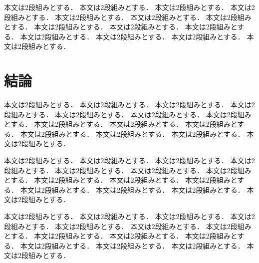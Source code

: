 \documentclass{/workdir/classes/summary}
\begin{document}
本文は2段組みとする．
本文は2段組みとする．
本文は2段組みとする．
本文は2段組みとする．
本文は2段組みとする．
本文は2段組みとする．
本文は2段組みとする．
本文は2段組みとする．
本文は2段組みとする．
本文は2段組みとする．
本文は2段組みとする．
本文は2段組みとする．
本文は2段組みとする．
本文は2段組みとする．

\section{結論}
本文は2段組みとする．
本文は2段組みとする．
本文は2段組みとする．
本文は2段組みとする．
本文は2段組みとする．
本文は2段組みとする．
本文は2段組みとする．
本文は2段組みとする．
本文は2段組みとする．
本文は2段組みとする．
本文は2段組みとする．
本文は2段組みとする．
本文は2段組みとする．
本文は2段組みとする．

本文は2段組みとする．
本文は2段組みとする．
本文は2段組みとする．
本文は2段組みとする．
本文は2段組みとする．
本文は2段組みとする．
本文は2段組みとする．
本文は2段組みとする．
本文は2段組みとする．
本文は2段組みとする．
本文は2段組みとする．
本文は2段組みとする．
本文は2段組みとする．
本文は2段組みとする．

本文は2段組みとする．
本文は2段組みとする．
本文は2段組みとする．
本文は2段組みとする．
本文は2段組みとする．
本文は2段組みとする．
本文は2段組みとする．
本文は2段組みとする．
本文は2段組みとする．
本文は2段組みとする．
本文は2段組みとする．
本文は2段組みとする．
本文は2段組みとする．
本文は2段組みとする．



\end{document}
